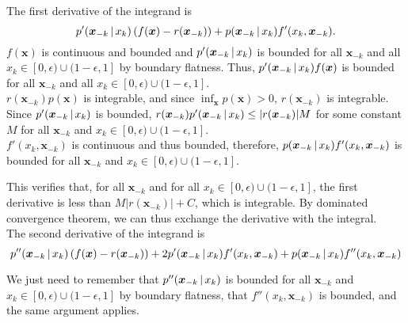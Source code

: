 The first derivative of the integrand is 
$$
p'(\mbox{\boldmath $x$}_{-k} {\,|\,} x_k)\left( f(\mbox{\boldmath $x$}) - r(\mbox{\boldmath $x$}_{-k}) \right) + p(\mbox{\boldmath $x$}_{-k} {\,|\,} x_k) f'(x_k, \mbox{\boldmath $x$}_{-k}).
$$
$f(\mathbf{x})$ is continuous and bounded and $p'(\mbox{\boldmath $x$}_{-k} {\,|\,} x_k)$ is bounded for all $\mathbf{x}_{-k}$ and all $x_k \in [0,\epsilon) \cup (1-\epsilon, 1]$ by boundary flatness. Thus, $p'(\mbox{\boldmath $x$}_{-k} {\,|\,} x_k) f(\mbox{\boldmath $x$})$ is bounded for all $\mathbf{x}_{-k}$ and all $x_k \in [0,\epsilon) \cup (1-\epsilon, 1]$.\\

$r(\mathbf{x}_{-k}) p(\mathbf{x})$ is integrable, and since $\inf_{\mathbf{x}} p(\mathbf{x}) > 0$, $r(\mathbf{x}_{-k})$ is integrable. Since $p'(\mbox{\boldmath $x$}_{-k} {\,|\,} x_k)$ is bounded, $r(\mbox{\boldmath $x$}_{-k}) p'(\mbox{\boldmath $x$}_{-k} {\,|\,} x_k) \leq |r(\mbox{\boldmath $x$}_{-k})|M$ for some constant $M$ for all $\mathbf{x}_{-k}$ and $x_k \in [0, \epsilon) \cup (1-\epsilon, 1]$. \\

$f'(x_k, \mathbf{x}_{-k})$ is continuous and thus bounded, therefore, $p(\mbox{\boldmath $x$}_{-k} {\,|\,} x_k) f'(x_k, \mbox{\boldmath $x$}_{-k})$ is bounded for all $\mathbf{x}_{-k}$ and $x_k \in [0, \epsilon) \cup (1-\epsilon, 1]$. 

This verifies that, for all $\mathbf{x}_{-k}$ and for all $x_k \in [0, \epsilon) \cup (1-\epsilon, 1]$, the first derivative is less than $M |r(\mathbf{x}_{-k})| + C$, which is integrable. By dominated convergence theorem, we can thus exchange the derivative with the integral. \\

The second derivative of the integrand is 
$$
p''(\mbox{\boldmath $x$}_{-k} {\,|\,} x_k) \left( f(\mbox{\boldmath $x$}) - r(\mbox{\boldmath $x$}_{-k}) \right) + 
  2 p'(\mbox{\boldmath $x$}_{-k} {\,|\,} x_k) f'(x_k, \mbox{\boldmath $x$}_{-k}) + p(\mbox{\boldmath $x$}_{-k} {\,|\,} x_k) f''(x_k, \mbox{\boldmath $x$}_{-k})
$$

We just need to remember that $p''(\mbox{\boldmath $x$}_{-k} {\,|\,} x_k)$ is bounded for all $\mathbf{x}_{-k}$ and $x_k \in [0, \epsilon) \cup (1-\epsilon, 1]$ by boundary flatness, that $f''(x_k, \mathbf{x}_{-k})$ is bounded, and the same argument applies.




